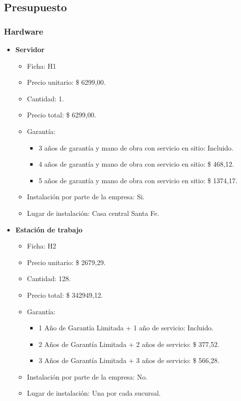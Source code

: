 \subsection{Presupuesto}

\subsubsection{Hardware}
\begin{itemize}
  \item \textbf{Servidor}
    \begin{itemize}
      \item Ficha: H1
      \item Precio unitario: \$ 6299,00.
      \item Cantidad: 1.
      \item Precio total: \$ 6299,00.
      \item Garantía:
        \begin{itemize}
          \item 3 años de garantía y mano de obra con servicio en sitio: Incluido.
          \item 4 años de garantía y mano de obra con servicio en sitio: \$  468,12.
          \item 5 años de garantía y mano de obra con servicio en sitio: \$ 1374,17.
        \end{itemize}
      \item Instalación por parte de la empresa: Si.
      \item Lugar de instalación: Casa central Santa Fe.
    \end{itemize}
  
  \item \textbf{Estación de trabajo}
    \begin{itemize}
      \item Ficha: H2
      \item Precio unitario: \$ 2679,29.
      \item Cantidad: 128.
      \item Precio total: \$ 342949,12.
      
      \item Garantía:
        \begin{itemize}
          \item 1 Año de Garantía Limitada + 1 año de servicio: Incluido.
          \item 2 Años de Garantía Limitada + 2 años de servicio: \$ 377,52.
          \item 3 Años de Garantía Limitada + 3 años de servicio: \$ 566,28.
        \end{itemize}
      \item Instalación por parte de la empresa: No.
      \item Lugar de instalación: Una por cada sucursal.
    \end{itemize}
  

\end{itemize}
